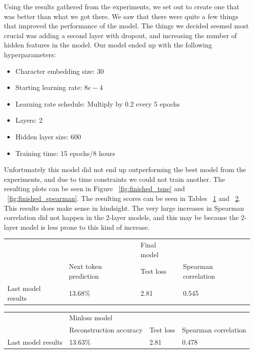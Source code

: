 Using the results gathered from the experiments, we set out to create one that was better than what we got there. We saw that there were quite a few things that improved the performance of the model. The things we decided seemed most crucial was adding a second layer with dropout, and increasing the number of hidden features in the model. Our model ended up with the following hyperparameters:
\begin{itemize}
    \item Character embedding size: 30
    \item Starting learning rate: $8e-4$
    \item Learning rate schedule: Multiply by $0.2$ every 5 epochs
    \item Layers: 2
    \item Hidden layer size: $600$
    \item Training time: 15 epochs/8 hours
\end{itemize}

Unfortunately this model did not end up outperforming the best model from the experiments, and due to time constraints we could not train another. The resulting plots can be seen in Figure ~\ref{fig:finished_tsne} and ~\ref{fig:finished_spearman}. The resulting scores can be seen in Tables ~\ref{tab:finished_results_final} and ~\ref{tab:finished_results_minloss}. This results does make sense in hindsight. The very large increases in Spearman correlation did not happen in the 2-layer models, and this may be because the 2-layer model is less prone to this kind of increase.

\begin{table}[!ht]
\begin{tabular}{|l|lll|}
\hline
                   &                                            & Final model                    &                      \\ \cline{2-4} 
                   & \multicolumn{1}{l|}{Next token prediction} & \multicolumn{1}{l|}{Test loss} & Spearman correlation \\ \hline
Last model results & \multicolumn{1}{l|}{13.68\%}               & \multicolumn{1}{l|}{2.81}      & 0.545                \\ \hline
\end{tabular}
\label{tab:finished_results_final}
\end{table}

\begin{table}[!ht]
\begin{tabular}{|l|lll|}
\hline
                   & Minloss model                                &                                &                      \\ \cline{2-4} 
                   & \multicolumn{1}{l|}{Reconstruction accuracy} & \multicolumn{1}{l|}{Test loss} & Spearman correlation \\ \hline
Last model results & \multicolumn{1}{l|}{13.63\%}                 & \multicolumn{1}{l|}{2.81}      & 0.478                \\ \hline
\end{tabular}
\label{tab:finished_results_minloss}
\end{table}


